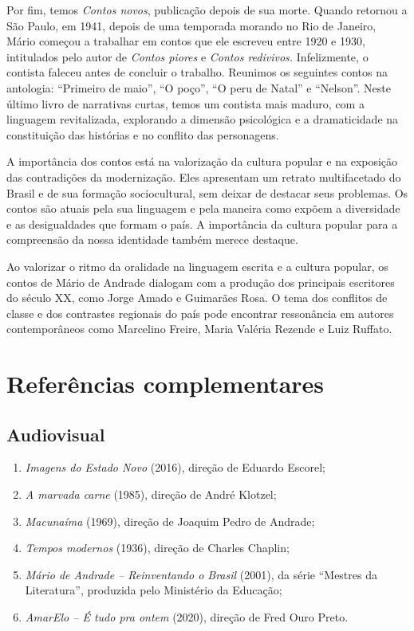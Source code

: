 \documentclass[12pt]{extarticle}
\begin{document}
Por fim, temos \emph{Contos novos}, publicação depois de sua morte.
Quando retornou a São Paulo, em 1941, depois de uma temporada morando no
Rio de Janeiro, Mário começou a trabalhar em contos que ele escreveu
entre 1920 e 1930, intitulados pelo autor de \emph{Contos piores} e
\emph{Contos redivivos.} Infelizmente, o contista faleceu antes de
concluir o trabalho. Reunimos os seguintes contos na antologia:
``Primeiro de maio'', ``O poço'', ``O peru de Natal'' e ``Nelson''.
Neste último livro de narrativas curtas, temos um contista mais maduro,
com a linguagem revitalizada, explorando a dimensão psicológica e a
dramaticidade na constituição das histórias e no conflito das
personagens.

A importância dos contos está na valorização da cultura popular e na
exposição das contradições da modernização. Eles apresentam um retrato
multifacetado do Brasil e de sua formação sociocultural, sem deixar de
destacar seus problemas. Os contos são atuais pela sua linguagem e pela
maneira como expõem a diversidade e as desigualdades que formam o país.
A importância da cultura popular para a compreensão da nossa identidade
também merece destaque.

Ao valorizar o ritmo da oralidade na linguagem escrita e a cultura
popular, os contos de Mário de Andrade dialogam com a produção dos
principais escritores do século XX, como Jorge Amado e Guimarães Rosa. O
tema dos conflitos de classe e dos contrastes regionais do país pode
encontrar ressonância em autores contemporâneos como Marcelino Freire,
Maria Valéria Rezende e Luiz Ruffato.

\section{Referências complementares}

\subsection{Audiovisual}

\begin{enumerate}
\item
  \emph{Imagens do Estado Novo} (2016), direção de Eduardo Escorel;
\item
  \emph{A marvada carne} (1985), direção de André Klotzel;
\item
  \emph{Macunaíma} (1969), direção de Joaquim Pedro de Andrade;
\item
  \emph{Tempos modernos} (1936), direção de Charles Chaplin;
\item
  \emph{Mário de Andrade -- Reinventando o Brasil} (2001), da série
  ``Mestres da Literatura'', produzida pelo Ministério da Educação;
\item
  \emph{AmarElo -- É tudo pra ontem} (2020), direção de Fred Ouro Preto.
\end{enumerate}
\end{document}
